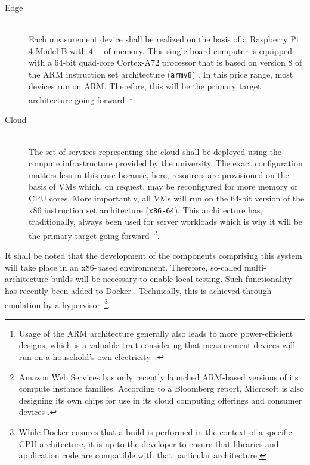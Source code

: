 \begin{description}
  \item[Edge]
  \hfill \\
  Each measurement device shall be realized on the basis of a Raspberry Pi 4 Model B with \SI{4}{\giga\byte} of memory. This single-board computer is equipped with a 64-bit quad-core Cortex-A72 processor that is based on version 8 of the \acs{ARM} instruction set architecture (\texttt{armv8}) \cite{raspberrypi4} \cite{arm2020v8a}. In this price range, most devices run on \acs{ARM}. Therefore, this will be the primary target architecture going forward~\footnote{Usage of the \acs{ARM} architecture generally also leads to more power-efficient designs, which is a valuable trait considering that measurement devices will run on a household's own electricity~\cite[p.~8837]{morabito2017virtualization}.}.

  \item[Cloud]
  \hfill \\
  The set of services representing the cloud shall be deployed using the compute infrastructure provided by the university. The exact configuration matters less in this case because, here, resources are provisioned on the basis of \acsp{VM} which, on request, may be reconfigured for more memory or \acs{CPU} cores. More importantly, all \acsp{VM} will run on the 64-bit version of the x86 instruction set architecture (\texttt{x86-64}). This architecture has, traditionally, always been used for server workloads which is why it will be the primary target going forward~\footnote{Amazon Web Services has only recently launched \acs{ARM}-based versions of its compute instance families. According to a Bloomberg report, Microsoft is also designing its own chips for use in its cloud computing offerings and consumer devices \cite{bloomberg2020microsoft}.}.
\end{description}

It shall be noted that the development of the components comprising this system will take place in an x86-based environment. Therefore, so-called multi-architecture builds will be necessary to enable local testing. Such functionality has recently been added to Docker \cite{docker2020multi}. Technically, this is achieved through emulation by a hypervisor~\footnote{While Docker ensures that a build is performed in the context of a specific \acs{CPU} architecture, it is up to the developer to ensure that libraries and application code are compatible with that particular architecture.}.


